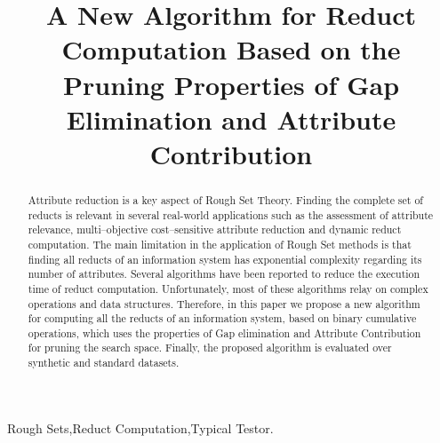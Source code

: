 \documentclass[authoryear,preprint,review,12pt]{elsarticle}
\begin{document}
	
	\title{A New Algorithm for Reduct Computation Based on the Pruning Properties of Gap Elimination 
		   and Attribute Contribution}
		
	
	\address{Computer Science Department\\National Institute of
	Astrophysics, Optics and Electronics\\
	Luis Enrique Erro \# 1, Santa Mar\'{\i}a Tonantzintla, Puebla,
	72840, M\'{e}xico} 
	
	\begin{abstract}
		Attribute reduction is a key aspect of Rough Set Theory.  Finding the complete set of reducts is relevant 
		in several real-world applications such as the assessment of attribute relevance, multi--objective 
		cost--sensitive attribute reduction and dynamic reduct computation. The main limitation in the application
		of Rough Set methods is that finding all reducts of an information system has exponential complexity 
		regarding its number of attributes. Several algorithms have been reported to reduce the execution time
		of reduct computation. Unfortunately, most of these algorithms relay on complex operations and data
		structures. Therefore, in this paper we propose a new algorithm for computing all the reducts of an
		information system, based on binary cumulative operations, which uses the properties of Gap 
		elimination and Attribute Contribution for pruning the search space. Finally, the proposed algorithm is
		evaluated over synthetic and standard datasets.
	\end{abstract}
	
	\begin{keyword}
		Rough Sets\sep Reduct Computation\sep Typical Testor.
	\end{keyword}

	\maketitle

\end{document}
